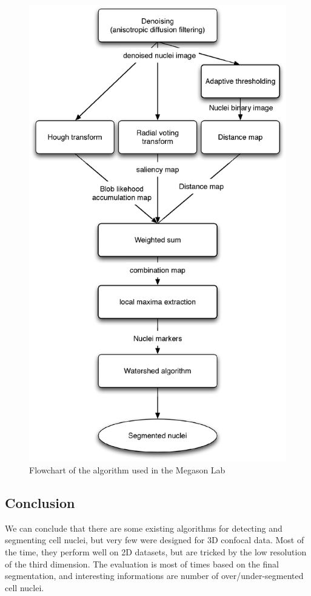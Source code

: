\begin{figure}[h]
\begin{center}
\leavevmode
\includegraphics[height=0.75\textheight]{pictures/kishoreFlowchart}
\end{center}
\caption{Flowchart of the algorithm used in the Megason Lab}
\label{fig:kishoreFlowchart}
\end{figure}
\clearpage


\subsection*{Conclusion}

We can conclude that there are some existing algorithms for detecting and segmenting cell nuclei,
but very few were designed for 3D confocal data.
Most of the time, they perform well on 2D datasets, but are tricked by the low resolution of the third dimension.
The evaluation is most of times based on the final segmentation, and interesting informations are number of over/under-segmented cell nuclei.



